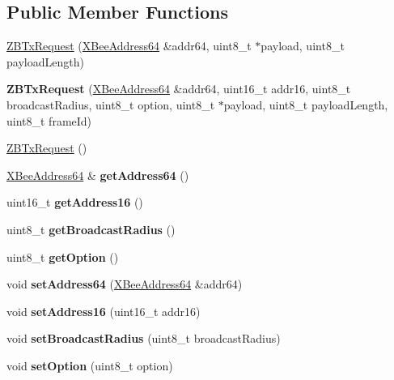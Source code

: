 \subsection*{\-Public \-Member \-Functions}
\begin{DoxyCompactItemize}
\item 
\hyperlink{classZBTxRequest_a47d9d87e0ab2e155ff3408acea5dcf7c}{\-Z\-B\-Tx\-Request} (\hyperlink{classXBeeAddress64}{\-X\-Bee\-Address64} \&addr64, uint8\-\_\-t $\ast$payload, uint8\-\_\-t payload\-Length)
\item 
\hypertarget{classZBTxRequest_a98f109c346e669049697665745605e67}{{\bfseries \-Z\-B\-Tx\-Request} (\hyperlink{classXBeeAddress64}{\-X\-Bee\-Address64} \&addr64, uint16\-\_\-t addr16, uint8\-\_\-t broadcast\-Radius, uint8\-\_\-t option, uint8\-\_\-t $\ast$payload, uint8\-\_\-t payload\-Length, uint8\-\_\-t frame\-Id)}\label{classZBTxRequest_a98f109c346e669049697665745605e67}

\item 
\hyperlink{classZBTxRequest_a410499f31a049f0bd4bbc8299ec74e24}{\-Z\-B\-Tx\-Request} ()
\item 
\hypertarget{classZBTxRequest_adbd44bb9801c9cba0c9ea4e87ed8efa5}{\hyperlink{classXBeeAddress64}{\-X\-Bee\-Address64} \& {\bfseries get\-Address64} ()}\label{classZBTxRequest_adbd44bb9801c9cba0c9ea4e87ed8efa5}

\item 
\hypertarget{classZBTxRequest_ac75b0c6db3b6c9b54c3df2891b267950}{uint16\-\_\-t {\bfseries get\-Address16} ()}\label{classZBTxRequest_ac75b0c6db3b6c9b54c3df2891b267950}

\item 
\hypertarget{classZBTxRequest_a6c4a33cab93ff1d18703c8ddd4db4056}{uint8\-\_\-t {\bfseries get\-Broadcast\-Radius} ()}\label{classZBTxRequest_a6c4a33cab93ff1d18703c8ddd4db4056}

\item 
\hypertarget{classZBTxRequest_a4b97981c2a07afdeeacff09e479b7d45}{uint8\-\_\-t {\bfseries get\-Option} ()}\label{classZBTxRequest_a4b97981c2a07afdeeacff09e479b7d45}

\item 
\hypertarget{classZBTxRequest_a32725cca51a846b716308497d066b7a7}{void {\bfseries set\-Address64} (\hyperlink{classXBeeAddress64}{\-X\-Bee\-Address64} \&addr64)}\label{classZBTxRequest_a32725cca51a846b716308497d066b7a7}

\item 
\hypertarget{classZBTxRequest_aa1ae1761a27f335d353428de9c986aff}{void {\bfseries set\-Address16} (uint16\-\_\-t addr16)}\label{classZBTxRequest_aa1ae1761a27f335d353428de9c986aff}

\item 
\hypertarget{classZBTxRequest_a2d2825234b6d42385998df927d0fe0cb}{void {\bfseries set\-Broadcast\-Radius} (uint8\-\_\-t broadcast\-Radius)}\label{classZBTxRequest_a2d2825234b6d42385998df927d0fe0cb}

\item 
\hypertarget{classZBTxRequest_a32b2ea4b2c457396a7463e2add7e14f6}{void {\bfseries set\-Option} (uint8\-\_\-t option)}\label{classZBTxRequest_a32b2ea4b2c457396a7463e2add7e14f6}

\end{DoxyCompactItemize}
